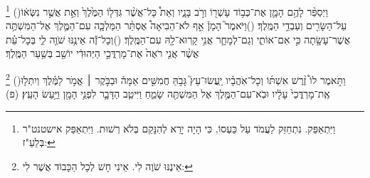 \documentclass[12pt, openany]{book}
\newcommand{\footnotecomment}[1]{
	\renewcommand\thefootnote{}
	\footnote{#1}}
\newcommand{\commenta}[1]{\footnotecomment{#1}\hspace{0em}}
\newcommand{\vsnum}[1]{(\hebrewnumeral{#1})\space}
\begin{document}
{\commenta{וַיִּתְאַפַּק. נִתְחַזֵּק לַעֲמֹד עַל כַּעְסוֹ, כִּי הָיָה יָרֵא לְהִנָּקֵם בְּלֹא רְשׁוּת. וַיִּתְאַפַּק אישטנט"ר בְּלַעַ"ז: }%
\vsnum{11}וַיְסַפֵּ֨ר לָהֶ֥ם הָמָ֛ן אֶת־כְּב֥וֹד עָשְׁר֖וֹ וְרֹ֣ב בָּנָ֑יו וְאֵת֩ כָּל־אֲשֶׁ֨ר גִּדְּל֤וֹ הַמֶּ֙לֶךְ֙ וְאֵ֣ת אֲשֶׁ֣ר נִשְּׂא֔וֹ עַל־הַשָּׂרִ֖ים וְעַבְדֵ֥י הַמֶּֽלֶךְ׃
\vsnum{12}וַיֹּאמֶר֮ הָמָן֒ אַ֣ף לֹא־הֵבִיאָה֩ אֶסְתֵּ֨ר הַמַּלְכָּ֧ה עִם־הַמֶּ֛לֶךְ אֶל־הַמִּשְׁתֶּ֥ה אֲשֶׁר־עָשָׂ֖תָה כִּ֣י אִם־אוֹתִ֑י וְגַם־לְמָחָ֛ר אֲנִ֥י קָֽרוּא־לָ֖הּ עִם־הַמֶּֽלֶךְ׃
\vsnum{13}וְכָל־זֶ֕ה אֵינֶ֥נּוּ שֹׁוֶ֖ה לִ֑י בְּכָל־עֵ֗ת אֲשֶׁ֨ר אֲנִ֤י רֹאֶה֙ אֶת־מָרְדֳּכַ֣י הַיְּהוּדִ֔י יוֹשֵׁ֖ב בְּשַׁ֥עַר הַמֶּֽלֶךְ׃%
\commenta{אֵינֶנּוּ שֹׁוֶה לִי. אֵינִי חָשׁ לְכָל הַכָּבוֹד אֲשֶׁר לִי:}%
\vsnum{14}וַתֹּ֣אמֶר לוֹ֩ זֶ֨רֶשׁ אִשְׁתּ֜וֹ וְכָל־אֹֽהֲבָ֗יו יַֽעֲשׂוּ־עֵץ֮ גָּבֹ֣הַּ חֲמִשִּׁ֣ים אַמָּה֒ וּבַבֹּ֣קֶר ׀ אֱמֹ֣ר לַמֶּ֗לֶךְ וְיִתְל֤וּ אֶֽת־מָרְדֳּכַי֙ עָלָ֔יו וּבֹֽא־עִם־הַמֶּ֥לֶךְ אֶל הַמִּשְׁתֶּ֖ה שָׂמֵ֑חַ וַיִּיטַ֧ב הַדָּבָ֛ר לִפְנֵ֥י הָמָ֖ן וַיַּ֥עַשׂ הָעֵֽץ׃ (פ)
\clearpage}
\end{document}
